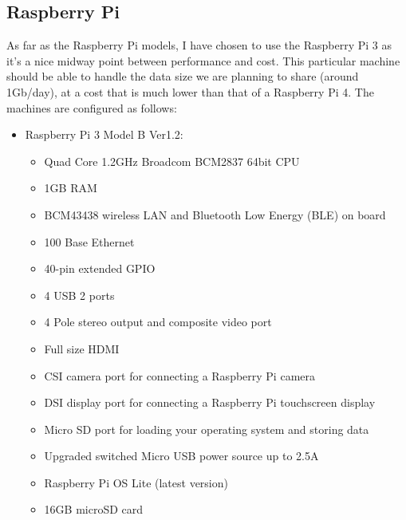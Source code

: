 \documentclass[a4paper,11pt]{scrartcl}
\begin{document}
\subsection{Raspberry Pi}
As far as the Raspberry Pi models, I have chosen to use the Raspberry Pi 3 as it's a nice midway point between performance and cost. This particular machine should be able to handle the data size we are planning to share (around 1Gb/day), at a cost that is much lower than that of a Raspberry Pi 4. The machines are configured as follows:
\begin{itemize}
    \item Raspberry Pi 3 Model B Ver1.2:
    \begin{itemize}
        \item Quad Core 1.2GHz Broadcom BCM2837 64bit CPU
        \item 1GB RAM
        \item BCM43438 wireless LAN and Bluetooth Low Energy (BLE) on board
        \item 100 Base Ethernet
        \item 40-pin extended GPIO
        \item 4 USB 2 ports
        \item 4 Pole stereo output and composite video port
        \item Full size HDMI
        \item CSI camera port for connecting a Raspberry Pi camera
        \item DSI display port for connecting a Raspberry Pi touchscreen display
        \item Micro SD port for loading your operating system and storing data
        \item Upgraded switched Micro USB power source up to 2.5A
        \item Raspberry Pi OS Lite (latest version)
        \item 16GB microSD card
    \end{itemize}
\end{itemize}
\end{document}
